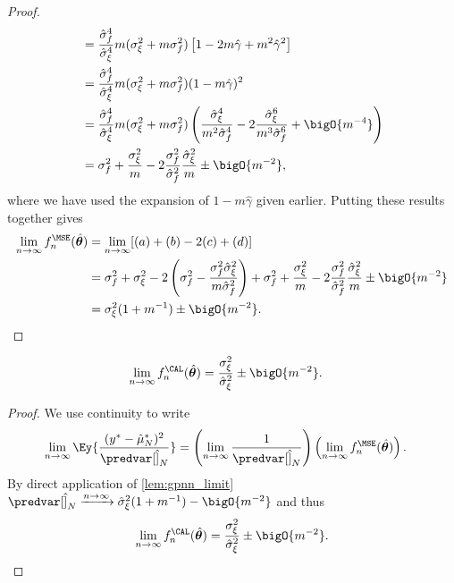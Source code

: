 \begin{proof}
\begin{align*}
        &= \frac{\hat{\sigma}_f^4}{\hat{\sigma}_\xi^4}m(\sigma_\xi^2+m\sigma_f^2)\left[1-2m\hat{\gamma}+m^2\hat{\gamma}^2\right] \\
        &= \frac{\hat{\sigma}_f^4}{\hat{\sigma}_\xi^4}m(\sigma_\xi^2+m\sigma_f^2)(1-m\hat{\gamma})^2 \\
        &= \frac{\hat{\sigma}_f^4}{\hat{\sigma}_\xi^4}m(\sigma_\xi^2+m\sigma_f^2)\left(\frac{\hat{\sigma}_\xi^4}{m^2\hat{\sigma}_f^4} - 2\frac{\hat{\sigma}_\xi^6}{m^3\hat{\sigma}_f^6} + \bigO{m^{-4}}\right) \\
        &= \sigma_f^2 + \frac{\sigma_\xi^2}{m} - 2\frac{\sigma_f^2}{\hat{\sigma}_f^2}\frac{\hat{\sigma}_\xi^2}{m} \pm \bigO{m^{-2}},
    \end{align*}
    where we have used the expansion of \(1-m\hat{\gamma}\) given earlier. Putting these results together gives
    \begin{align*}
        \lim_{n\rightarrow\infty}f_n^{\MSE}(\hat{\bm{\theta}}) &= \lim_{n\rightarrow\infty} [(a) + (b) -2 (c) + (d)] \\
        &= \sigma_f^2 + \sigma_\xi^2 - 2\left(\sigma_f^2 - \frac{\sigma_f^2\hat{\sigma}_\xi^2}{m\hat{\sigma}_f^2}\right) + \sigma_f^2 + \frac{\sigma_\xi^2}{m} - 2\frac{\sigma_f^2}{\hat{\sigma}_f^2}\frac{\hat{\sigma}_\xi^2}{m} \pm \bigO{m^{-2}} \\
        &= \sigma_\xi^2(1+m^{-1}) \pm \bigO{m^{-2}}.
    \end{align*}
\end{proof}

\begin{lemma}
    \label{lem:mismatched_cal_limit}
    \begin{align*}
    \lim_{n\rightarrow\infty} f_n^{\CAL}(\hat{\bm{\theta}}) &= \frac{\sigma_\xi^2}{\hat{\sigma}_\xi^2} \pm \bigO{m^{-2}}.
    \end{align*}
\end{lemma}
\begin{proof}\label{proof:mismatched_cal_limit}
        We use continuity to write
    \begin{align*}
        \lim_{n\rightarrow\infty}\Ey{\frac{(y^*-\hat{\mu}_N^*)^2}{\predvar[\hat]_N}}  &= \left(\lim_{n\rightarrow\infty}\frac{1}{\predvar[\hat]_N}\right)\left(\lim_{n\rightarrow\infty}f_n^{\MSE}(\hat{\bm{\theta}})\right).
    \end{align*}
    By direct application of \autoref{lem:gpnn_limit} \(\predvar[\hat]_N\xrightarrow{n\rightarrow\infty} \hat{\sigma}_\xi^2(1+m^{-1}) - \bigO{m^{-2}}\) and thus
    \[\lim_{n\rightarrow\infty} f_n^{\CAL}(\hat{\bm{\theta}}) = \frac{\sigma_\xi^2}{\hat{\sigma}_\xi^2} \pm \bigO{m^{-2}}.\]
\end{proof}

